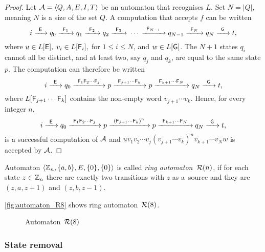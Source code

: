 \begin{proof}
    Let ${\mathcal{A}} = \langle Q, A, E, I, T \rangle$ be an automaton that recognises $L$. Set $N = |Q|$, meaning $N$ is a size of the set $Q$. A computation that accepts $f$ can be written
    \[
        i {\; \xrightarrow[]{\: \; {\mathsf{E}} \: \;} \;} q_0 {\; \xrightarrow[]{\: \; {\mathsf{F}}_1 \: \;} \;} q_1 {\; \xrightarrow[]{\: \; {\mathsf{F}}_2 \: \;} \;} q_2 {\; \xrightarrow[]{\: \; {\mathsf{F}}_3 \: \;} \;} \dotsm {\; \xrightarrow[]{\: \; {\mathsf{F}}_{N-1} \: \;} \;} q_{N-1} {\; \xrightarrow[]{\: \; {\mathsf{F}}_{N} \: \;} \;} q_N {\; \xrightarrow[]{\: \; {\mathsf{G}} \: \;} \;} t,
    \]
    where $u \in L[{\mathsf{E}}], \; v_i \in L[{\mathsf{F}}_i], $ for $ 1 \leq i \leq N$, and $w \in L[{\mathsf{G}}]$. The $N + 1$ states $q_i$ cannot all be distinct, and at least two, say $q_j$ and $q_k$, are equal to the same state $p$. The computation can therefore be written
    \[
        i {\; \xrightarrow[]{\: \; {\mathsf{E}} \: \;} \;} q_0 {\; \xrightarrow[]{\: \; {\mathsf{F}}_1 {\mathsf{F}}_2 \dotsm {\mathsf{F}}_j \: \;} \;} p {\; \xrightarrow[]{\: \; {\mathsf{F}}_{j+1} \dotsm {\mathsf{F}}_k \: \;} \;} p {\; \xrightarrow[]{\: \; {\mathsf{F}}_{k+1} \dotsm {\mathsf{F}}_N \: \;} \;} q_N {\; \xrightarrow[]{\: \; {\mathsf{G}} \: \;} \;} t,
    \]
    where $L[{\mathsf{F}}_{j+1} \dotsm {\mathsf{F}}_k]$ contains the non-empty word $v_{j+1} \dotsm v_k$. Hence, for every integer $n$,
    \[
        i {\; \xrightarrow[]{\: \; {\mathsf{E}} \: \;} \;} q_0 {\; \xrightarrow[]{\: \; {\mathsf{F}}_1 {\mathsf{F}}_2 \dotsm {\mathsf{F}}_j \: \;} \;} p {\; \xrightarrow[]{\: \; {({\mathsf{F}}_{j+1} \dotsm {\mathsf{F}}_k)}^n \: \;} \;} p {\; \xrightarrow[]{\: \; {\mathsf{F}}_{k+1} \dotsm {\mathsf{F}}_N \: \;} \;} q_N {\; \xrightarrow[]{\: \; {\mathsf{G}} \: \;} \;} t,
    \]
    is a successful computation of ${\mathcal{A}}$ and $u v_1 v_2 \dotsm v_j {(v_{j+1} \dotsm v_k)}^n v_{k+1} \dotsm v_N w$ is accepted by ${\mathcal{A}}$.
\end{proof}

\begin{defn}
    Automaton $\langle \mathbb{Z}_n, \{a,b\}, E, \{0\}, \{0\} \rangle$ is called \emph{ring automaton~${{\mathcal{R}}(n)}$}, if for each state $z \in \mathbb{Z}_n$ there are exactly two transitions with $z$ as a~source and they are $(z, a, z+1)$ and $(z, b, z-1)$.
\end{defn}

\begin{example}
    \autoref*{fig:automaton_R8} shows ring automaton~${{\mathcal{R}}(8)}$.

    \begin{figure}[h]
        \centering
        
        \caption{Automaton~${{\mathcal{R}}(8)}$}\label{fig:automaton_R8}
    \end{figure}
\end{example}

\subsubsection*{State removal }


